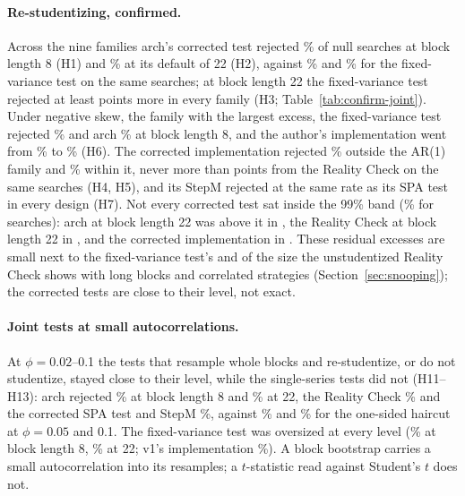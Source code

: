 \paragraph{Re-studentizing, confirmed.} Across the nine families arch's corrected test rejected \% of null searches at block length 8 (H1) and \% at its default of 22 (H2), against \% and \% for the fixed-variance test on the same searches; at block length 22 the fixed-variance test rejected at least  points more in every family (H3; Table~\ref{tab:confirm-joint}). Under negative skew, the family with the largest excess, the fixed-variance test rejected \% and arch \% at block length 8, and the author's implementation went from \% to \% (H6). The corrected implementation rejected \% outside the AR(1) family and \% within it, never more than  points from the Reality Check on the same searches (H4, H5), and its StepM rejected at the same rate as its SPA test in every design (H7). Not every corrected test sat inside the 99\% band (\% for  searches): arch at block length 22 was above it in , the Reality Check at block length 22 in , and the corrected implementation in . These residual excesses are small next to the fixed-variance test's and of the size the unstudentized Reality Check shows with long blocks and correlated strategies (Section~\ref{sec:snooping}); the corrected tests are close to their level, not exact.

\paragraph{Joint tests at small autocorrelations.} At $\phi=0.02$--0.1 the tests that resample whole blocks and re-studentize, or do not studentize, stayed close to their level, while the single-series tests did not (H11--H13): arch rejected \% at block length 8 and \% at 22, the Reality Check \% and the corrected SPA test and StepM \%, against \% and \% for the one-sided haircut at $\phi=0.05$ and 0.1. The fixed-variance test was oversized at every level (\% at block length 8, \% at 22; v1's implementation \%). A block bootstrap carries a small autocorrelation into its resamples; a $t$-statistic read against Student's $t$ does not.


